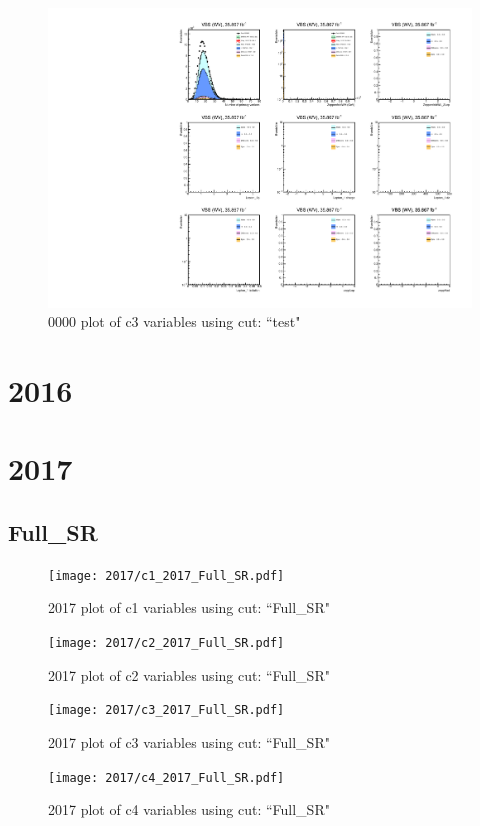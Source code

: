 \documentclass{article}
\begin{document}
                        \begin{figure}[H]
                            \centering
                            \caption{0000 plot of c3 variables using cut: ``test"}
                            \includegraphics[width=\textwidth]{0000/c3_0000_test.pdf}
                        \end{figure}    
    \section*{2016}
    \section*{2017}
      \subsection*{Full\_SR}
                        \begin{figure}[H]
                            \centering
                            \caption{2017 plot of c1 variables using cut: ``Full\_SR"}
                            \texttt{[image: 2017/c1\_2017\_Full\_SR.pdf]}
                        \end{figure}    
                        \begin{figure}[H]
                            \centering
                            \caption{2017 plot of c2 variables using cut: ``Full\_SR"}
                            \texttt{[image: 2017/c2\_2017\_Full\_SR.pdf]}
                        \end{figure}    
                        \begin{figure}[H]
                            \centering
                            \caption{2017 plot of c3 variables using cut: ``Full\_SR"}
                            \texttt{[image: 2017/c3\_2017\_Full\_SR.pdf]}
                        \end{figure}    
                        \begin{figure}[H]
                            \centering
                            \caption{2017 plot of c4 variables using cut: ``Full\_SR"}
                            \texttt{[image: 2017/c4\_2017\_Full\_SR.pdf]}
                        \end{figure}    
\end{document}
